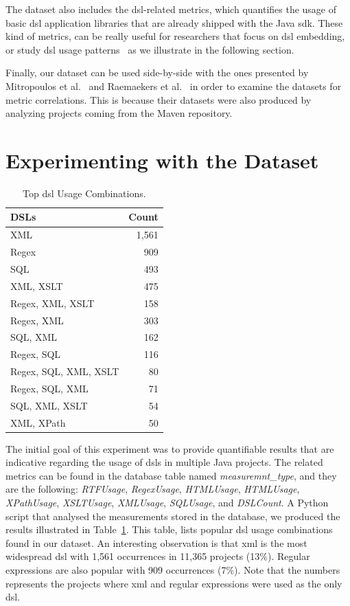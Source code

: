 \documentclass[conference]{IEEEtran}
\begin{document}
The dataset also includes the {\sc dsl}-related metrics, which quantifies the usage of basic {\sc dsl} application libraries that are already shipped with the Java {\sc sdk}. These kind of metrics, can be really useful for researchers that focus on {\sc dsl} embedding, or study {\sc dsl} usage patterns~\cite{KARA14} as we illustrate in the following section.

Finally, our dataset can be used side-by-side with the ones presented by Mitropoulos et al.~\cite{HP04} and Raemaekers et al.~\cite{RDV13} in order to examine the datasets for metric correlations. This is because their datasets were also produced by analyzing projects coming from the Maven repository.

\section{Experimenting with the Dataset}
\label{sec:dsl}

\begin{table}[!t]
\caption{Top {\sc dsl} Usage Combinations.}
\label{tbl:dsl-top-usage}
\centering
\begin{tabular}{|l||r|}
 \hline
\textbf{DSLs} & \textbf{Count}\\
\hline
XML & 1,561\\
\hline
Regex & 909\\
\hline
SQL & 493\\
\hline
XML, XSLT & 475\\
\hline
Regex, XML, XSLT & 158\\
\hline
Regex, XML & 303\\
\hline
SQL, XML & 162\\
\hline
Regex, SQL & 116\\
\hline
Regex, SQL, XML, XSLT & 80\\
\hline
Regex, SQL, XML & 71\\
\hline
SQL, XML, XSLT & 54\\
\hline
XML, XPath & 50\\
\hline
\end{tabular}
\end{table}

The initial goal of this experiment was to provide quantifiable results that are indicative regarding the usage of {\sc dsl}s in multiple Java projects. The related metrics can be found in the database table named \textit{measuremnt\_type}, and they are the following: \textit{RTFUsage}, \textit{RegexUsage}, \textit{HTMLUsage}, \textit{HTMLUsage}, \textit{XPathUsage}, \textit{XSLTUsage}, \textit{XMLUsage}, \textit{SQLUsage}, and \textit{DSLCount}. A Python script that analysed the measurements stored in the database, we produced the results illustrated in Table~\ref{tbl:dsl-top-usage}. This table, lists popular {\sc dsl} usage combinations found in our dataset. An interesting observation is that {\sc xml} is the most widespread {\sc dsl} with 1,561 occurrences in 11,365 projects (13\%). Regular expressions are also popular with 909 occurrences (7\%). Note that the numbers represents the projects where {\sc xml} and regular expressions were used as the only {\sc dsl}.
\end{document}
